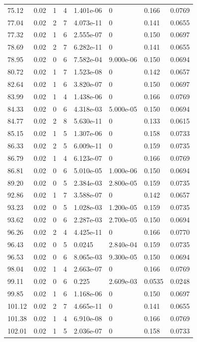 \documentclass[preview]{standalone}
\begin{document}
{{{\begin{tabular}{L{1.2cm}C{1.2cm} C{0.3cm}C{0.5cm} C{1.4cm}C{1.4cm} C{1.4cm}C{1.4cm}}
  75.12  &  0.02  & 1     &  4 &  1.401e-06  & 0  & 0.166 &  0.0769   \\ 
  77.04  &  0.02  & 2     &  7 &  4.073e-11  & 0  & 0.141 &  0.0655   \\ 
  77.32  &  0.02  & 1     &  6 &  2.555e-07  & 0  & 0.150 &  0.0697   \\ 
  78.69  &  0.02  & 2     &  7 &  6.282e-11  & 0  & 0.141 &  0.0655   \\ 
  78.95  &  0.02  & 0     &  6 &  7.582e-04  & 9.000e-06  & 0.150 &  0.0694   \\ 
  80.72  &  0.02  & 1     &  7 &  1.523e-08  & 0  & 0.142 &  0.0657   \\ 
  82.64  &  0.02  & 1     &  6 &  3.820e-07  & 0  & 0.150 &  0.0697   \\ 
  83.99  &  0.02  & 1     &  4 &  1.438e-06  & 0  & 0.166 &  0.0769   \\ 
  84.33  &  0.02  & 0     &  6 &  4.318e-03  & 5.000e-05  & 0.150 &  0.0694   \\ 
  84.77  &  0.02  & 2     &  8 &  5.630e-11  & 0  & 0.133 &  0.0615   \\ 
  85.15  &  0.02  & 1     &  5 &  1.307e-06  & 0  & 0.158 &  0.0733   \\ 
  86.33  &  0.02  & 2     &  5 &  6.009e-11  & 0  & 0.159 &  0.0735   \\ 
  86.79  &  0.02  & 1     &  4 &  6.123e-07  & 0  & 0.166 &  0.0769   \\ 
  86.81  &  0.02  & 0     &  6 &  5.010e-05  & 1.000e-06  & 0.150 &  0.0694   \\ 
  89.20  &  0.02  & 0     &  5 &  2.384e-03  & 2.800e-05  & 0.159 &  0.0735   \\ 
  92.86  &  0.02  & 1     &  7 &  3.588e-07  & 0  & 0.142 &  0.0657   \\ 
  93.23  &  0.02  & 0     &  5 &  1.028e-03  & 1.200e-05  & 0.159 &  0.0735   \\ 
  93.62  &  0.02  & 0     &  6 &  2.287e-03  & 2.700e-05  & 0.150 &  0.0694   \\ 
  96.26  &  0.02  & 2     &  4 &  4.425e-11  & 0  & 0.166 &  0.0770   \\ 
  96.43  &  0.02  & 0     &  5 &  0.0245  & 2.840e-04  & 0.159 &  0.0735   \\ 
  96.53  &  0.02  & 0     &  6 &  8.065e-03  & 9.300e-05  & 0.150 &  0.0694   \\ 
  98.04  &  0.02  & 1     &  4 &  2.663e-07  & 0  & 0.166 &  0.0769   \\ 
  99.11  &  0.02  & 0     &  6 &  0.225  & 2.609e-03  & 0.0535 &  0.0248   \\ 
  99.85  &  0.02  & 1     &  6 &  1.168e-06  & 0  & 0.150 &  0.0697   \\ 
  101.12  &  0.02  & 2     &  7 &  4.665e-11  & 0  & 0.141 &  0.0655   \\ 
  101.38  &  0.02  & 1     &  4 &  6.910e-08  & 0  & 0.166 &  0.0769   \\ 
  102.01  &  0.02  & 1     &  5 &  2.036e-07  & 0  & 0.158 &  0.0733   \\ 
\hline 
\end{tabular} 

}}}
\end{document}
